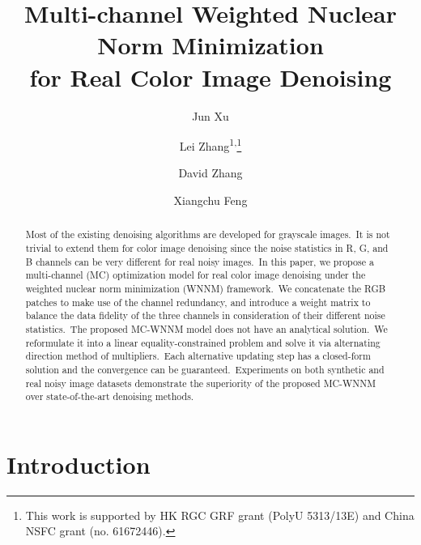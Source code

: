 \documentclass[10pt,twocolumn,letterpaper]{article}
\begin{document}
 

\title{Multi-channel Weighted Nuclear Norm Minimization 
\\
for Real Color Image Denoising}
\vspace{-4mm}
\author[1]{Jun Xu}
\author[\empty]{Lei Zhang\textsuperscript{1,}\thanks{This work is supported by HK RGC GRF grant (PolyU 5313/13E) and China NSFC grant (no. 61672446).}}
\author[1]{David Zhang}
\author[2]{Xiangchu Feng}
\vspace{-4mm}

\maketitle
\vspace{-4mm}


\begin{abstract}
Most of the existing denoising algorithms are developed for grayscale images.\ It is not trivial to extend them for color image denoising since the noise statistics in R, G, and B channels can be very different for real noisy images.\ In this paper, we propose a multi-channel (MC) optimization model for real color image denoising under the weighted nuclear norm minimization (WNNM) framework.\ We concatenate the RGB patches to make use of the channel redundancy, and introduce a weight matrix to balance the data fidelity of the three channels in consideration of their different noise statistics.\ The proposed MC-WNNM model does not have an analytical solution.\ We reformulate it into a linear equality-constrained problem and solve it via alternating direction method of multipliers.\ Each alternative updating step has a closed-form solution and the convergence can be guaranteed.\ Experiments on both synthetic and real noisy image datasets demonstrate the superiority of the proposed MC-WNNM over state-of-the-art denoising methods. 
\end{abstract}

\vspace{-3mm}
\section{Introduction}
\vspace{-2mm}
\end{document}
